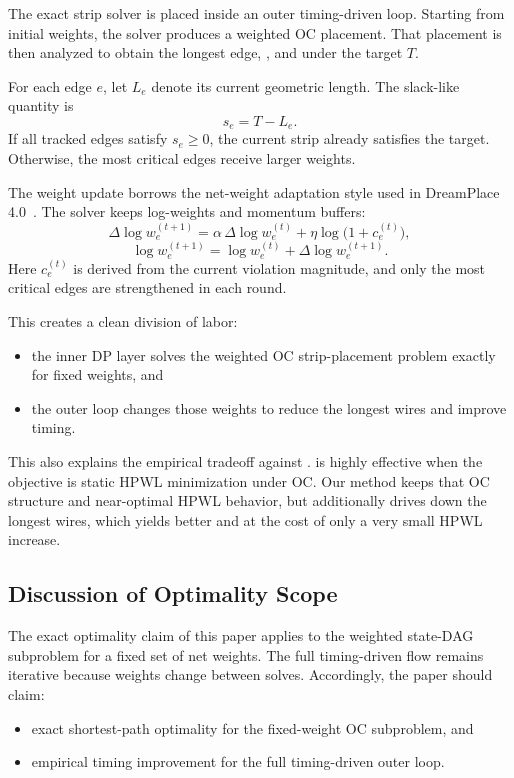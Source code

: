 The exact strip solver is placed inside an outer timing-driven loop. Starting from initial weights, the solver produces a weighted OC placement. That placement is then analyzed to obtain the longest edge, \wns, and \tns under the target $T$.

For each edge $e$, let $L_e$ denote its current geometric length. The slack-like quantity is
\begin{equation}
s_e = T - L_e.
\end{equation}
If all tracked edges satisfy $s_e \ge 0$, the current strip already satisfies the target. Otherwise, the most critical edges receive larger weights.

The weight update borrows the net-weight adaptation style used in DreamPlace 4.0~\cite{dreamplace4}. The solver keeps log-weights and momentum buffers:
\begin{equation}
\Delta \log w_e^{(t+1)} = \alpha\,\Delta \log w_e^{(t)} + \eta \log\bigl(1+c_e^{(t)}\bigr),
\label{eq:dreamplace_style_1}
\end{equation}
\begin{equation}
\log w_e^{(t+1)} = \log w_e^{(t)} + \Delta \log w_e^{(t+1)}.
\label{eq:dreamplace_style_2}
\end{equation}
Here $c_e^{(t)}$ is derived from the current violation magnitude, and only the most critical edges are strengthened in each round.

This creates a clean division of labor:
\begin{itemize}[leftmargin=*,topsep=2pt,itemsep=2pt]
\item the inner DP layer solves the weighted OC strip-placement problem exactly for fixed weights, and
\item the outer loop changes those weights to reduce the longest wires and improve timing.
\end{itemize}

This also explains the empirical tradeoff against \rsad. \rsad is highly effective when the objective is static HPWL minimization under OC. Our method keeps that OC structure and near-optimal HPWL behavior, but additionally drives down the longest wires, which yields better \wns and \fmax at the cost of only a very small HPWL increase.

\subsection{Discussion of Optimality Scope}

The exact optimality claim of this paper applies to the weighted state-DAG subproblem for a fixed set of net weights. The full timing-driven flow remains iterative because weights change between solves. Accordingly, the paper should claim:
\begin{itemize}[leftmargin=*,topsep=2pt,itemsep=2pt]
\item exact shortest-path optimality for the fixed-weight OC subproblem, and
\item empirical timing improvement for the full timing-driven outer loop.
\end{itemize}
